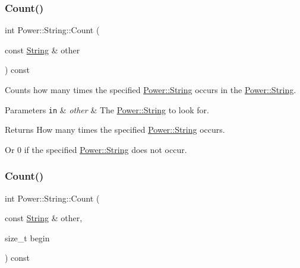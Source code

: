 \subsubsection{\texorpdfstring{Count()}{Count()}\hspace{0.1cm}{\footnotesize\ttfamily [1/12]}}
{\footnotesize\ttfamily int Power\+::\+String\+::\+Count (\begin{DoxyParamCaption}\item[{const \hyperlink{class_power_1_1_string}{String} \&}]{other }\end{DoxyParamCaption}) const\hspace{0.3cm}{\ttfamily [inline]}}



Counts how many times the specified \hyperlink{class_power_1_1_string}{Power\+::\+String} occurs in the \hyperlink{class_power_1_1_string}{Power\+::\+String}. 


\begin{DoxyParams}[1]{Parameters}
\mbox{\tt in}  & {\em other} & The \hyperlink{class_power_1_1_string}{Power\+::\+String} to look for. \\
\hline
\end{DoxyParams}
\begin{DoxyReturn}{Returns}
How many times the specified \hyperlink{class_power_1_1_string}{Power\+::\+String} occurs. 

Or 0 if the specified \hyperlink{class_power_1_1_string}{Power\+::\+String} does not occur. 
\end{DoxyReturn}
\mbox{\label{class_power_1_1_string_a0f03e2c894d116eed594ca5c36befa74}} 
\subsubsection{\texorpdfstring{Count()}{Count()}\hspace{0.1cm}{\footnotesize\ttfamily [2/12]}}
{\footnotesize\ttfamily int Power\+::\+String\+::\+Count (\begin{DoxyParamCaption}\item[{const \hyperlink{class_power_1_1_string}{String} \&}]{other,  }\item[{size\+\_\+t}]{begin }\end{DoxyParamCaption}) const\hspace{0.3cm}{\ttfamily [inline]}}



